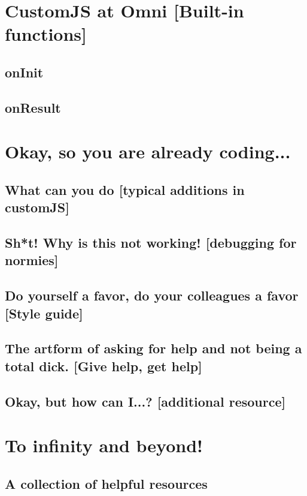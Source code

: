 \documentclass[11pt,a4paper,oldfontcommands]{memoir}
\begin{document}
\chapter{CustomJS at Omni \small{[Built-in functions]}}
    \label{chap:omni}
    
    \section{onInit}
    \label{sec:onInit}
    
    
    \section{onResult}
    \label{sec:onResult}
    

\chapter{Okay, so you are already coding...}
    \label{chap:coding}

    \section{What can you do \small{[typical additions in customJS]}}
    \label{sec:whatDo}
    
    
    \section{Sh*t! Why is this not working! \small{[debugging for normies]}}
    \label{sec:fix}
    
    
    \section{Do yourself a favor, do your colleagues a favor \small{[Style guide]}}
    \label{sec:style}
    
    
    \section{The artform of asking for help and not being a total dick. \small{[Give help, get help]}}
    \label{sec:help}
    
    

\section{Okay, but how can I...? \small{[additional resource]}}


\appendix

\chapter{To infinity and beyond!}
\section{A collection of helpful resources}




\end{document}
